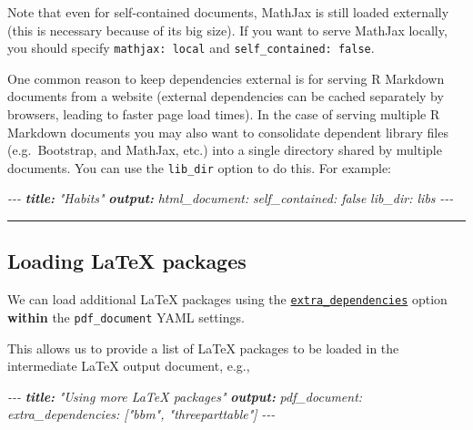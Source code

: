 \documentclass[
  a4paper,
  twoside,
  openright]{book}
\newenvironment{Shaded}{\begin{snugshade}}{\end{snugshade}}
\newcommand{\AnnotationTok}[1]{\textcolor[rgb]{0.56,0.35,0.01}{\textbf{\textit{#1}}}}
\newcommand{\CommentTok}[1]{\textcolor[rgb]{0.56,0.35,0.01}{\textit{#1}}}
\theoremstyle{definition}
\theoremstyle{definition}
\theoremstyle{definition}
\theoremstyle{definition}
\theoremstyle{remark}
\begin{document}
Note that even for self-contained documents, MathJax is still loaded externally (this is necessary because of its big size). If you want to serve MathJax locally, you should specify \texttt{mathjax:\ local} and \texttt{self\_contained:\ false}.

One common reason to keep dependencies external is for serving R Markdown documents from a website (external dependencies can be cached separately by browsers, leading to faster page load times). In the case of serving multiple R Markdown documents you may also want to consolidate dependent library files (e.g.~Bootstrap, and MathJax, etc.) into a single directory shared by multiple documents. You can use the \texttt{lib\_dir} option to do this. For example:

\begin{Shaded}
\begin{Highlighting}[]
\CommentTok{{-}{-}{-}}
\AnnotationTok{title:}\CommentTok{ "Habits"}
\AnnotationTok{output:}
\CommentTok{  html\_document:}
\CommentTok{    self\_contained: false}
\CommentTok{    lib\_dir: libs}
\CommentTok{{-}{-}{-}}
\end{Highlighting}
\end{Shaded}

\begin{center}\rule{0.5\linewidth}{0.5pt}\end{center}

\subsection*{Loading LaTeX packages}\label{loading-latex-packages}

We can load additional LaTeX packages using the \href{https://bookdown.org/yihui/rmarkdown-cookbook/latex-extra.html}{\texttt{extra\_dependencies}} option {\textbf{within} the \texttt{pdf\_document}} YAML settings.

This allows us to provide a list of LaTeX packages to be loaded in the intermediate LaTeX output document, e.g.,

\begin{Shaded}
\begin{Highlighting}[]
\CommentTok{{-}{-}{-}}
\AnnotationTok{title:}\CommentTok{ "Using more LaTeX packages"}
\AnnotationTok{output:}\CommentTok{ }
\CommentTok{  pdf\_document:}
\CommentTok{    extra\_dependencies: ["bbm", "threeparttable"]}
\CommentTok{{-}{-}{-}}
\end{Highlighting}
\end{Shaded}
\end{document}
